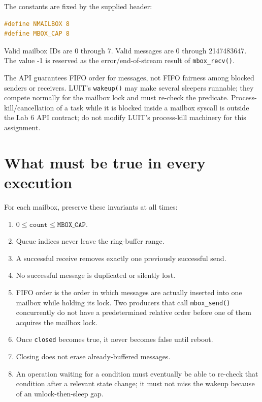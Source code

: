 \documentclass[11pt,a4paper]{article}
\newcommand{\file}[1]{\texttt{#1}}
\begin{document}
The constants are fixed by the supplied header:

\begin{lstlisting}[language=C]
#define NMAILBOX 8
#define MBOX_CAP 8
\end{lstlisting}

Valid mailbox IDs are 0 through 7. Valid messages are 0 through 2147483647. The value -1 is reserved as the error/end-of-stream result of \file{mbox\_recv()}.

The API guarantees FIFO order for messages, not FIFO fairness among blocked senders or receivers. LUIT's \file{wakeup()} may make several sleepers runnable; they compete normally for the mailbox lock and must re-check the predicate. Process-kill/cancellation of a task while it is blocked inside a mailbox syscall is outside the Lab 6 API contract; do not modify LUIT's process-kill machinery for this assignment.

\section{What must be true in every execution}

For each mailbox, preserve these invariants at all times:

\begin{enumerate}[leftmargin=7mm]
\item \(0 \leq \texttt{count} \leq \texttt{MBOX\_CAP}\).
\item Queue indices never leave the ring-buffer range.
\item A successful receive removes exactly one previously successful send.
\item No successful message is duplicated or silently lost.
\item FIFO order is the order in which messages are actually inserted into one mailbox while holding its lock. Two producers that call \file{mbox\_send()} concurrently do not have a predetermined relative order before one of them acquires the mailbox lock.
\item Once \file{closed} becomes true, it never becomes false until reboot.
\item Closing does not erase already-buffered messages.
\item An operation waiting for a condition must eventually be able to re-check that condition after a relevant state change; it must not miss the wakeup because of an unlock-then-sleep gap.
\end{enumerate}
\end{document}
